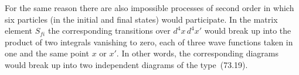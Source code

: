 For the same reason there are also impossible processes of second order in which six particles (in the initial and final states) would participate. In the matrix element $S_{fi}$ the corresponding transitions over $d^4x\,d^4x'$ would break up into the product of two integrals vanishing to zero, each of three wave functions taken in one and the same point $x$ or $x'$. In other words, the corresponding diagrams would break up into two independent diagrams of the type~(73.19).
